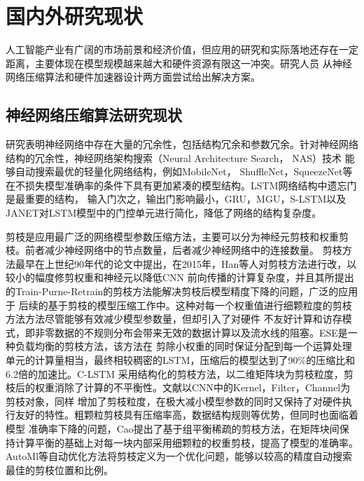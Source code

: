 

\section{国内外研究现状}
人工智能产业有广阔的市场前景和经济价值，但应用的研究和实际落地还存在一定距离，主要体现在模型规模越来越大和硬件资源有限这一冲突。研究人员
从神经网络压缩算法和硬件加速器设计两方面尝试给出解决方案。

\subsection{神经网络压缩算法研究现状}
研究表明神经网络中存在大量的冗余性，包括结构冗余和参数冗余。针对神经网络结构的冗余性，神经网络架构搜索（Neural Architecture Search， NAS）技术
能够自动搜索最优的轻量化网络结构，例如MobileNet，
ShuffleNet，SqueezeNet等在不损失模型准确率的条件下具有更加紧凑的模型结构。LSTM网络结构中遗忘门是最重要的结构，
输入门次之，输出门影响最小，GRU，MGU，S-LSTM以及JANET对LSTM模型中的门控单元进行简化，降低了网络的结构复杂度。

剪枝是应用最广泛的网络模型参数压缩方法，主要可以分为神经元剪枝和权重剪枝。前者减少神经网络中的节点数量，后者减少神经网络中的连接数量。
剪枝方法最早在上世纪90年代的论文中提出，在2015年，Han等人对剪枝方法进行改，以较小的幅度修剪权重和神经元以降低CNN
前向传播的计算复杂度，并且其所提出的Train-Purne-Retrain的剪枝方法能解决剪枝后模型精度下降的问题，广泛的应用于
后续的基于剪枝的模型压缩工作中。这种对每一个权重值进行细颗粒度的剪枝方法方法尽管能够有效减少模型参数量，但却引入了对硬件
不友好计算和访存模式，即非零数据的不规则分布会带来无效的数据计算以及流水线的阻塞。ESE是一种负载均衡的剪枝方法，该方法在
剪除小权重的同时保证分配到每一个运算处理单元的计算量相当，最终相较稠密的LSTM，压缩后的模型达到了90\%的压缩比和6.2倍的加速比。C-LSTM
采用结构化的剪枝方法，以二维矩阵块为剪枝粒度，剪枝后的权重消除了计算的不平衡性。文献以CNN中的Kernel，Filter，Channel为剪枝对象，同样
增加了剪枝粒度，在极大减小模型参数的同时又保持了对硬件执行友好的特性。粗颗粒剪枝具有压缩率高，数据结构规则等优势，但同时也面临着模型
准确率下降的问题，Cao提出了基于组平衡稀疏的剪枝方法，在矩阵块间保持计算平衡的基础上对每一块内部采用细颗粒的权重剪枝，提高了模型的准确率。
AutoMl等自动优化方法将剪枝定义为一个优化问题，能够以较高的精度自动搜索最佳的剪枝位置和比例。

